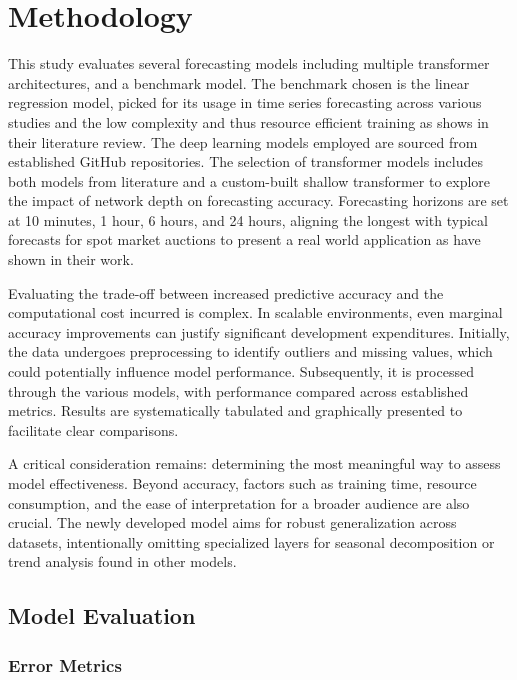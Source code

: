 \documentclass{article}
\begin{document}
\section{Methodology}

This study evaluates several forecasting models including multiple transformer architectures, and a benchmark model. The benchmark chosen is the linear regression model, picked for its usage in time series forecasting across various studies and the low complexity and thus resource efficient training as \cite{linear_forecasting_survey} shows in their literature review. The deep learning models employed are sourced from established GitHub repositories. The selection of transformer models includes both models from literature and a custom-built shallow transformer to explore the impact of network depth on forecasting accuracy. Forecasting horizons are set at 10 minutes, 1 hour, 6 hours, and 24 hours, aligning the longest with typical forecasts for spot market auctions to present a real world application as \cite{spot_market_forecasting} have shown in their work.

Evaluating the trade-off between increased predictive accuracy and the computational cost incurred is complex. In scalable environments, even marginal accuracy improvements can justify significant development expenditures. Initially, the data undergoes preprocessing to identify outliers and missing values, which could potentially influence model performance. Subsequently, it is processed through the various models, with performance compared across established metrics. Results are systematically tabulated and graphically presented to facilitate clear comparisons.

A critical consideration remains: determining the most meaningful way to assess model effectiveness. Beyond accuracy, factors such as training time, resource consumption, and the ease of interpretation for a broader audience are also crucial. The newly developed model aims for robust generalization across datasets, intentionally omitting specialized layers for seasonal decomposition or trend analysis found in other models.


\subsection{Model Evaluation}
\subsubsection{Error Metrics}
\end{document}
